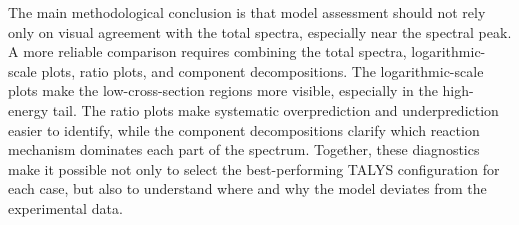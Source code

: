 The main methodological conclusion is that model assessment should not rely only on visual agreement with the total spectra, especially near the spectral peak. A more reliable comparison requires combining the total spectra, logarithmic-scale plots, ratio plots, and component decompositions. The logarithmic-scale plots make the low-cross-section regions more visible, especially in the high-energy tail. The ratio plots make systematic overprediction and underprediction easier to identify, while the component decompositions clarify which reaction mechanism dominates each part of the spectrum. Together, these diagnostics make it possible not only to select the best-performing TALYS configuration for each case, but also to understand where and why the model deviates from the experimental data.

